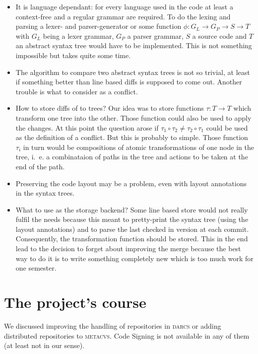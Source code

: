 \documentclass[fleqn, 10pt, a4paper]{article}
\begin{document}
\begin{itemize}
\item It is language dependant: for every language used in the code at
  least a context-free and a regular grammar are required. To do the
  lexing and parsing a lexer- and parser-generator or some function
  $\phi : G_L \rightarrow G_P \rightarrow S \rightarrow T$ with $G_L$
  being a lexer grammar, $G_P$ a parser grammar, $S$ a source code and
  $T$ an abstract syntax tree would have to be implemented. This is
  not something impossible but takes quite some time.
\item The algorithm to compare two abstract syntax trees is not so
  trivial, at least if something better than line based diffs is
  supposed to come out. Another trouble is what to consider as a
  conflict.
\item How to store diffs of to trees? Our idea was to store functions
  $\tau : T \rightarrow T$ which transform one tree into the other.
  Those function could also be used to apply the changes. At this
  point the question arose if $\tau_1 \circ \tau_2 \neq \tau_2 \circ
  \tau_1$ could be used as the definition of a conflict. But this is
  probably to simple.  Those function $\tau_i$ in turn would be
  compositions of atomic transformations of one node in the tree,
  i.~e. a combinataion of paths in the tree and actions to be taken at
  the end of the path.
\item Preserving the code layout may be a problem, even with layout
  annotations in the syntax trees.
\item What to use as the storage backend? Some line based store would
  not really fulfil the needs because this meant to pretty-print the
  syntax tree (using the layout annotations) and to parse the last
  checked in version at each commit. Consequently, the transformation
  function should be stored. This in the end lead to the decision to
  forget about improving the merge because the best way to do it is to
  write something completely new which is too much work for one
  semester.
\end{itemize}


\section{The project's course}

We discussed improving the handling of repositories in \textsc{darcs} or
adding distributed repositories to \textsc{metacvs}. Code Signing is not
available in any of them (at least not in our sense).
\end{document}
